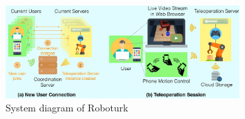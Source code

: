  \begin{figure}[htb]
         \centering
         \includegraphics[width=0.8\textwidth]{Figures/images/indirect_demonstration/roboturk.jpg}
         \caption{System diagram of Roboturk \cite{mandlekar2018roboturk}}
         \label{fig:roboturk}
\end{figure}

